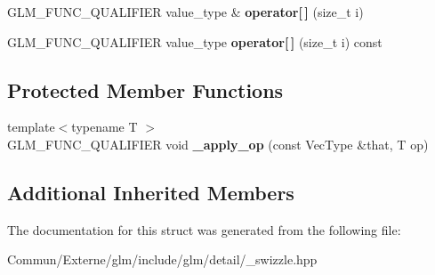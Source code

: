 \begin{DoxyCompactItemize}
\item 
G\+L\+M\+\_\+\+F\+U\+N\+C\+\_\+\+Q\+U\+A\+L\+I\+F\+I\+ER value\+\_\+type \& {\bfseries operator\mbox{[}$\,$\mbox{]}} (size\+\_\+t i)\hypertarget{structglm_1_1detail_1_1__swizzle__base2_aa3f2ab8e3e1a5c414b3fdca4cf75b706}{}\label{structglm_1_1detail_1_1__swizzle__base2_aa3f2ab8e3e1a5c414b3fdca4cf75b706}

\item 
G\+L\+M\+\_\+\+F\+U\+N\+C\+\_\+\+Q\+U\+A\+L\+I\+F\+I\+ER value\+\_\+type {\bfseries operator\mbox{[}$\,$\mbox{]}} (size\+\_\+t i) const \hypertarget{structglm_1_1detail_1_1__swizzle__base2_a1bec6727adac01b6bc3e1ccba935167e}{}\label{structglm_1_1detail_1_1__swizzle__base2_a1bec6727adac01b6bc3e1ccba935167e}

\end{DoxyCompactItemize}
\subsection*{Protected Member Functions}
\begin{DoxyCompactItemize}
\item 
{\footnotesize template$<$typename T $>$ }\\G\+L\+M\+\_\+\+F\+U\+N\+C\+\_\+\+Q\+U\+A\+L\+I\+F\+I\+ER void {\bfseries \+\_\+apply\+\_\+op} (const Vec\+Type \&that, T op)\hypertarget{structglm_1_1detail_1_1__swizzle__base2_a11d049274a60ecf4aac8cebc4c4e9be5}{}\label{structglm_1_1detail_1_1__swizzle__base2_a11d049274a60ecf4aac8cebc4c4e9be5}

\end{DoxyCompactItemize}
\subsection*{Additional Inherited Members}


The documentation for this struct was generated from the following file\+:\begin{DoxyCompactItemize}
\item 
Commun/\+Externe/glm/include/glm/detail/\+\_\+swizzle.\+hpp\end{DoxyCompactItemize}
